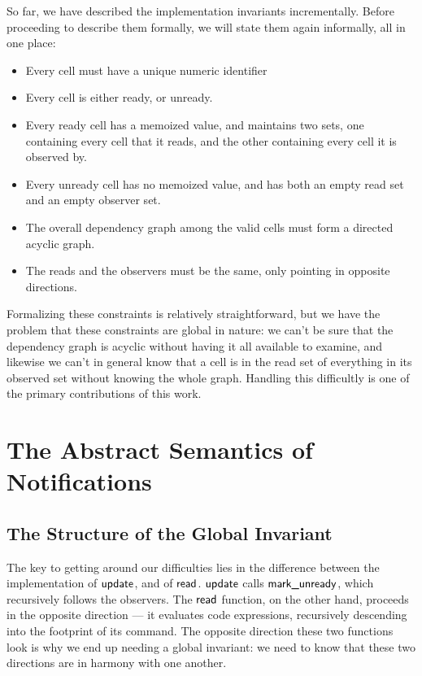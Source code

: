\documentclass[preprint,natbib]{sigplanconf}
\begin{document}
So far, we have described the implementation invariants incrementally.
Before proceeding to describe them formally, we will state them again
informally, all in one place:

\begin{itemize}
  \item Every cell must have a unique numeric identifier
  \item Every cell is either ready, or unready. 
  \item Every ready cell has a memoized value, and maintains 
    two sets, one containing every cell that it reads, and the
    other containing every cell it is observed by. 
  \item Every unready cell has no memoized value, and has 
    both an empty read set and an empty observer set. 
  \item The overall dependency graph among the valid cells must form a
    directed acyclic graph. 
  \item The reads and the observers must be the same, only 
    pointing in opposite directions.
\end{itemize}

Formalizing these constraints is relatively straightforward, but we
have the problem that these constraints are global in nature:
we can't be sure that the dependency graph is acyclic without having
it all available to examine, and likewise we can't in general know
that a cell is in the read set of everything in its observed set
without knowing the whole graph. Handling this difficultly is one of
the primary contributions of this work. 

\section{The Abstract Semantics of Notifications}

\subsection{The Structure of the Global Invariant}

The key to getting around our difficulties lies in the difference
between the implementation of $\mbox{\textsf{{update}}}$, and of $\mbox{\textsf{{read}}}$.
$\mbox{\textsf{{update}}}$ calls $\mbox{\textsf{{mark\_unready}}}$, which recursively follows
the observers. The $\mbox{\textsf{{read}}}$ function, on the other hand,
proceeds in the opposite direction --- it evaluates code expressions,
recursively descending into the footprint of its command. The opposite
direction these two functions look is why we end up needing a global
invariant: we need to know that these two directions are in harmony
with one another.
\end{document}
